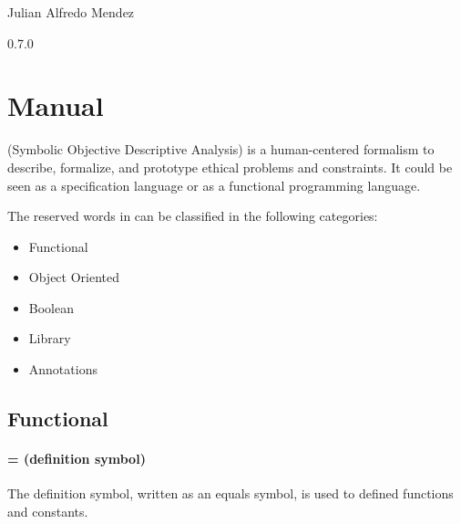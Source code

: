 \documentclass[12pt,a4paper]{book}
\begin{document}
    \begin{center}

        \phantom{H}

        \vspace{80mm}

        {\huge{\Soda}}

        \vspace{80mm}
        Julian Alfredo Mendez

        \vspace{10mm}
        0.7.0

    \end{center}

    \newpage


    \chapter{Manual}

    \Soda (Symbolic Objective Descriptive Analysis) is a human-centered formalism to describe, formalize, and prototype ethical problems and constraints.
    It could be seen as a specification language or as a functional programming language.

    The reserved words in \Soda can be classified in the following categories:

    \begin{itemize}
        \item Functional
        \item Object Oriented
        \item Boolean
        \item Library
        \item Annotations
    \end{itemize}




    \section{Functional}

    \subsubsection{= (definition symbol)}

    The definition symbol, written as an equals symbol, is used to defined functions and constants.
\end{document}
